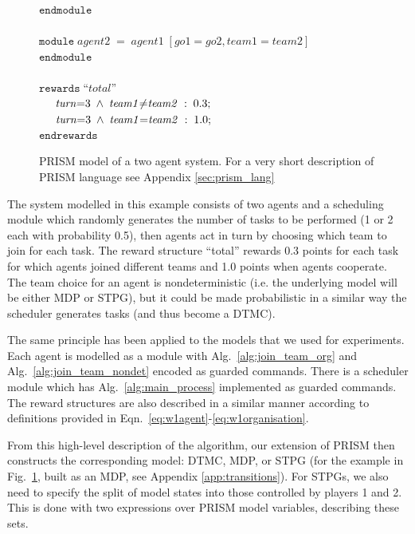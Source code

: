 \documentclass{llncs}
\newcommand{\prismkeyword}[1]{\mathtt{#1}}
\newcommand{\prismident}[1]{\mathit{#1}}
\newcommand{\prismtab}{\hspace*{0.5cm}}
\begin{document}
\begin{figure}
{{\begin{minipage}{6in}
\begin{tabbing}
\mbox{$\prismkeyword{endmodule}$} \\
\mbox{} \\
\mbox{$\prismkeyword{module} \; \prismident{agent2} \; {=} \; \prismident{agent1} \; [\prismident{go1}{=}\prismident{go2},\prismident{team1}{=}\prismident{team2}]$} \\
\mbox{$\prismkeyword{endmodule}$} \\
\mbox{} \\
\mbox{$\prismkeyword{rewards} \; \mbox{``}\prismident{total}\mbox{''}$} \\
\mbox{$\prismtab\prismident{turn}{=}3 \; \wedge \; \prismident{team1}{\neq}\prismident{team2} \; : \; 0.3;\prismtab$} \\
\mbox{$\prismtab\prismident{turn}{=}3 \; \wedge \; \prismident{team1}{=}\prismident{team2} \; : \; 1.0;$} \\
\mbox{$\prismkeyword{endrewards}$}
\end{tabbing}
\end{minipage}}}
\caption{PRISM model of a two agent system. For a very short description of PRISM language see Appendix \ref{sec:prism_lang}}
\label{fig:prism_example}
\end{figure}
\vspace{-8mm}
%
The system modelled in this example consists of two agents and a scheduling module which randomly generates the number of tasks to be performed (1 or 2 each with probability 0.5), then agents act in turn by choosing which team to join for each task. The reward structure ``total'' rewards 0.3 points for each task for which agents joined different teams and 1.0 points when agents cooperate. The team choice for an agent is nondeterministic (i.e. the underlying model will be either MDP or STPG), but it could be made probabilistic in a similar way the scheduler generates tasks (and thus become a DTMC).

The same principle has been applied to the models that we used for experiments. Each agent is modelled as a module with Alg.~\ref{alg:join_team_org} and Alg.~\ref{alg:join_team_nondet} encoded as guarded commands. There is a scheduler module which has Alg.~\ref{alg:main_process} implemented as guarded commands. The reward structures are also described in a similar manner according to definitions provided in Eqn.~\eqref{eq:w1agent}-\eqref{eq:w1organisation}.

From this high-level description of the algorithm, our extension of PRISM then constructs the corresponding model: DTMC, MDP, or STPG (for the example in Fig.~\ref{fig:prism_example}, built as an MDP, see Appendix \ref{app:transitions}).
For STPGs, we also need to specify the split of model states into those controlled by players 1 and 2.
This is done with two expressions over PRISM model variables, describing these sets.
\end{document}
